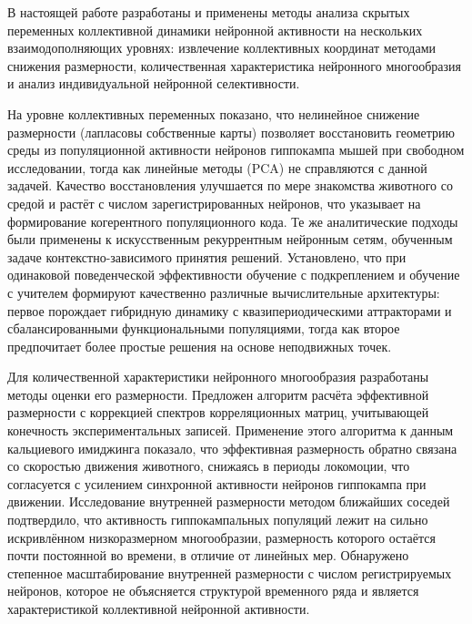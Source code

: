 
В настоящей работе разработаны и применены методы анализа скрытых переменных коллективной динамики нейронной активности на нескольких взаимодополняющих уровнях: извлечение коллективных координат методами снижения размерности, количественная характеристика нейронного многообразия и анализ индивидуальной нейронной селективности.

На уровне коллективных переменных показано, что нелинейное снижение размерности (лапласовы собственные карты) позволяет восстановить геометрию среды из популяционной активности нейронов гиппокампа мышей при свободном исследовании, тогда как линейные методы (PCA) не справляются с данной задачей. Качество восстановления улучшается по мере знакомства животного со средой и растёт с числом зарегистрированных нейронов, что указывает на формирование когерентного популяционного кода. Те же аналитические подходы были применены к искусственным рекуррентным нейронным сетям, обученным задаче контекстно-зависимого принятия решений. Установлено, что при одинаковой поведенческой эффективности обучение с подкреплением и обучение с учителем формируют качественно различные вычислительные архитектуры: первое порождает гибридную динамику с квазипериодическими аттракторами и сбалансированными функциональными популяциями, тогда как второе предпочитает более простые решения на основе неподвижных точек.

Для количественной характеристики нейронного многообразия разработаны методы оценки его размерности. Предложен алгоритм расчёта эффективной размерности с коррекцией спектров корреляционных матриц, учитывающей конечность экспериментальных записей. Применение этого алгоритма к данным кальциевого имиджинга показало, что эффективная размерность обратно связана со скоростью движения животного, снижаясь в периоды локомоции, что согласуется с усилением синхронной активности нейронов гиппокампа при движении. Исследование внутренней размерности методом ближайших соседей подтвердило, что активность гиппокампальных популяций лежит на сильно искривлённом низкоразмерном многообразии, размерность которого остаётся почти постоянной во времени, в отличие от линейных мер. Обнаружено степенное масштабирование внутренней размерности с числом регистрируемых нейронов, которое не объясняется структурой временного ряда и является характеристикой коллективной нейронной активности.

